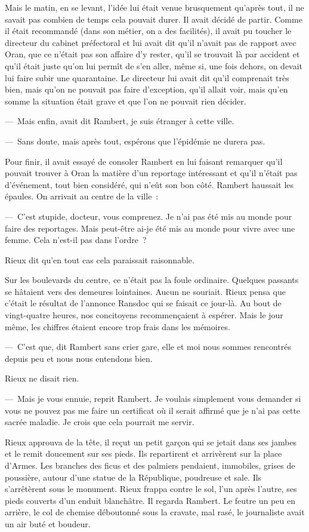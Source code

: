\documentclass[french,twoside]{book} %
\begin{document}
Mais le matin, en se levant, l’idée lui était venue brusquement qu’après tout, il ne savait pas combien de temps cela pouvait durer. Il avait décidé de partir. Comme il était recommandé (dans son métier, on a des facilités), il avait pu toucher le directeur du cabinet préfectoral et lui avait dit qu’il n’avait pas de rapport avec Oran, que ce n’était pas son affaire d’y rester, qu’il se trouvait là par accident et qu’il était juste qu’on lui permît de s’en aller, même si, une fois dehors, on devait lui faire subir une quarantaine. Le directeur lui avait dit qu’il comprenait très bien, mais qu’on ne pouvait pas faire d’exception, qu’il allait voir, mais qu’en somme la situation était grave et que l’on ne pouvait rien décider.\par
— Mais enfin, avait dit Rambert, je suis étranger à cette ville.\par
— Sans doute, mais après tout, espérons que l’épidémie ne durera pas.\par
Pour finir, il avait essayé de consoler Rambert en lui faisant remarquer qu’il pouvait trouver à Oran la matière d’un reportage intéressant et qu’il n’était pas d’événement, tout bien considéré, qui n’eût son bon côté. Rambert haussait les épaules. On arrivait au centre de la ville :\par
— C’est stupide, docteur, vous comprenez. Je n’ai pas été mis au monde pour faire des reportages. Mais peut-être ai-je été mis au monde pour vivre avec une femme. Cela n’est-il pas dans l’ordre ?\par
Rieux dit qu’en tout cas cela paraissait raisonnable.\par
Sur les boulevards du centre, ce n’était pas la foule ordinaire. Quelques passants se hâtaient vers des demeures lointaines. Aucun ne souriait. Rieux pensa que c’était le résultat de l’annonce Ransdoc qui se faisait ce jour-là. Au bout de vingt-quatre heures, nos concitoyens recommençaient à espérer. Mais le jour même, les chiffres étaient encore trop frais dans les mémoires.\par
— C’est que, dit Rambert sans crier gare, elle et moi nous sommes rencontrés depuis peu et nous nous entendons bien.\par
Rieux ne disait rien.\par
— Mais je vous ennuie, reprit Rambert. Je voulais simplement vous demander si vous ne pouvez pas me faire un certificat où il serait affirmé que je n’ai pas cette sacrée maladie. Je crois que cela pourrait me servir.\par
Rieux approuva de la tête, il reçut un petit garçon qui se jetait dans ses jambes et le remit doucement sur ses pieds. Ils repartirent et arrivèrent sur la place d’Armes. Les branches des ficus et des palmiers pendaient, immobiles, grises de poussière, autour d’une statue de la République, poudreuse et sale. Ils s’arrêtèrent sous le monument. Rieux frappa contre le sol, l’un après l’autre, ses pieds couverts d’un enduit blanchâtre. Il regarda Rambert. Le feutre un peu en arrière, le col de chemise déboutonné sous la cravate, mal rasé, le journaliste avait un air buté et boudeur.\par
\end{document}

